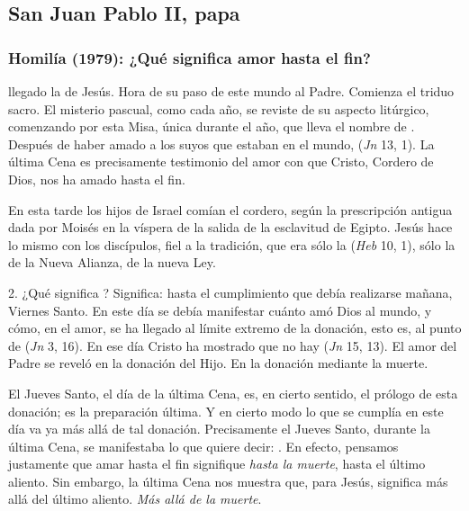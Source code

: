 \newsection
\subsection{San Juan Pablo II, papa}

\subsubsection{Homilía (1979): ¿Qué significa amor hasta el fin?}


\begin{body}
 llegado la  de Jesús. Hora de su paso de este mundo al Padre. Comienza el triduo sacro. El misterio pascual, como cada año, se reviste de su aspecto litúrgico, comenzando por esta Misa, única durante el año, que lleva el nombre de . Después de haber amado a los suyos que estaban en el mundo,  (\textit{Jn} 13, 1). La última Cena es precisamente testimonio del amor con que Cristo, Cordero de Dios, nos ha amado hasta el fin.

En esta tarde los hijos de Israel comían el cordero, según la prescripción antigua dada por Moisés en la víspera de la salida de la esclavitud de Egipto. Jesús hace lo mismo con los discípulos, fiel a la tradición, que era sólo la  (\textit{Heb} 10, 1), sólo la  de la Nueva Alianza, de la nueva Ley.

2. ¿Qué significa ? Significa: hasta el cumplimiento que debía realizarse mañana, Viernes Santo. En este día se debía manifestar cuánto amó Dios al mundo, y cómo, en el amor, se ha llegado al límite extremo de la donación, esto es, al punto de  (\textit{Jn} 3, 16). En ese día Cristo ha mostrado que no hay  (\textit{Jn} 15, 13). El amor del Padre se reveló en la donación del Hijo. En la donación mediante la muerte.

El Jueves Santo, el día de la última Cena, es, en cierto sentido, el prólogo de esta donación; es la preparación última. Y en cierto modo lo que se cumplía en este día va ya más allá de tal donación. Precisamente el Jueves Santo, durante la última Cena, se manifestaba lo que quiere decir: . En efecto, pensamos justamente que amar hasta el fin signifique \textit{hasta la muerte}, hasta el último aliento. Sin embargo, la última Cena nos muestra que, para Jesús,  significa más allá del último aliento. \textit{Más allá de la muerte}.


\end{body}
